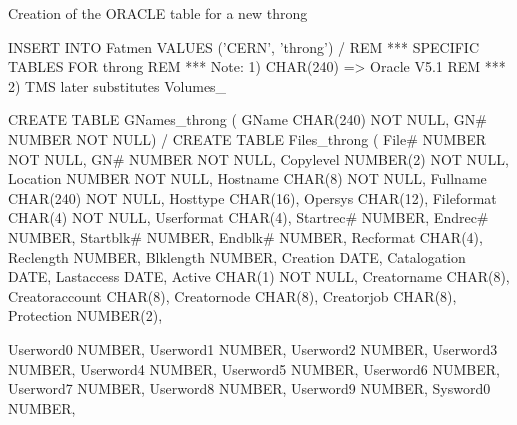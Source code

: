 \begin{Fighere}
\caption{Creation of the ORACLE table for a new throng}
\label{FORATAB}
\begin{minipage}[t]{.494\linewidth}
\begin{XMP}
INSERT INTO Fatmen VALUES ('CERN', 'throng')
/
REM ***   SPECIFIC TABLES FOR throng
REM ***   Note: 1) CHAR(240) => Oracle V5.1
REM ***         2) TMS later substitutes Volumes_
 
CREATE TABLE GNames_throng ( GName CHAR(240) NOT NULL,
                             GN# NUMBER NOT NULL)
/
CREATE TABLE Files_throng ( File# NUMBER NOT NULL,
                            GN# NUMBER NOT NULL,
                            Copylevel NUMBER(2) NOT NULL,
                            Location NUMBER NOT NULL,
                            Hostname CHAR(8) NOT NULL,
                            Fullname CHAR(240) NOT NULL,
                            Hosttype CHAR(16),
                            Opersys CHAR(12),
                            Fileformat CHAR(4) NOT NULL,
                            Userformat CHAR(4),
                            Startrec# NUMBER,
                            Endrec# NUMBER,
                            Startblk# NUMBER,
                            Endblk# NUMBER,
                            Recformat CHAR(4),
                            Reclength NUMBER,
                            Blklength NUMBER,
                            Creation DATE,
                            Catalogation DATE,
                            Lastaccess DATE,
                            Active CHAR(1) NOT NULL,
                            Creatorname CHAR(8),
                            Creatoraccount CHAR(8),
                            Creatornode CHAR(8),
                            Creatorjob CHAR(8),
                            Protection NUMBER(2),
\end{XMP}
\end{minipage}\hfill
\begin{minipage}[t]{.494\linewidth}
\begin{XMP}
                            Userword0 NUMBER,
                            Userword1 NUMBER,
                            Userword2 NUMBER,
                            Userword3 NUMBER,
                            Userword4 NUMBER,
                            Userword5 NUMBER,
                            Userword6 NUMBER,
                            Userword7 NUMBER,
                            Userword8 NUMBER,
                            Userword9 NUMBER,
                            Sysword0 NUMBER,

\end{XMP}
\end{minipage}
\end{Fighere}
